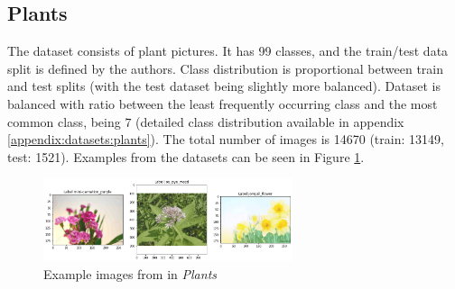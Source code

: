 \subsection{Plants}

The dataset consists of plant pictures. It has 99 classes, and the train/test data split is defined by the authors. Class distribution is proportional between train and test splits (with the test dataset being slightly more balanced). Dataset is balanced with ratio between the least frequently occurring class and the most common class, being $7$ (detailed class distribution available in appendix \ref{appendix:datasets:plants}). The total number of images is 14670 (train: 13149, test: 1521). Examples from the datasets can be seen in Figure \ref{fig:plants-example}.

\begin{figure}[ht]
    \centering
    \includegraphics[width=0.65\textwidth]{experiments/datasets/plants.png}
    \caption{Example images from in \textit{Plants} \cite{plants-dataset}}\label{fig:plants-example}
\end{figure}
